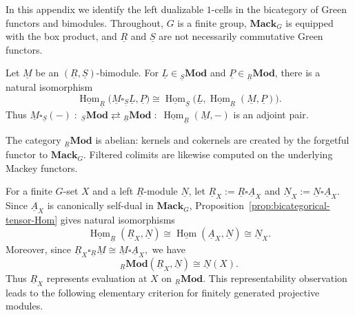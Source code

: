\documentclass[11pt,oneside]{amsart}
\DeclareMathOperator{\Hom}{Hom}
\numberwithin{equation}{section}
\numberwithin{figure}{section}
\theoremstyle{plain}
\theoremstyle{definition}
\theoremstyle{remark}
\begin{document}
In this appendix we identify the left dualizable \(1\)-cells in the
bicategory of Green functors and bimodules.  Throughout, \(G\) is a finite
group, \(\mathbf{Mack}_G\) is equipped with the box product, and
\(\underline R\) and \(\underline S\) are not necessarily commutative
Green functors.

\begin{prop}\label{prop:bicategorical-tensor-Hom}\cite{lewis1981theory}
Let \(\underline M\) be an
\((\underline R,\underline S)\)-bimodule.  For
\(\underline L\in{}_{\underline S}\mathbf{Mod}\) and
\(\underline P\in{}_{\underline R}\mathbf{Mod}\), there is a natural
isomorphism
\begin{equation}\label{eq:boxS-HomR-adjunction}
\underline{\Hom}_{\underline R}
 \bigl(\underline M\square_{\underline S}\underline L,\underline P\bigr)
\cong
\underline{\Hom}_{\underline S}
 \bigl(\underline L,
       \underline{\Hom}_{\underline R}(\underline M,\underline P)\bigr).
\end{equation}
Thus
\(
\underline M\square_{\underline S}(-)
\;:\;
{}_{\underline S}\mathbf{Mod}
\rightleftarrows
{}_{\underline R}\mathbf{Mod}
\;:\;
\underline{\Hom}_{\underline R}(\underline M,-)
\)
is an adjoint pair.
\end{prop}

The category \({}_{\underline R}\mathbf{Mod}\) is abelian: kernels and
cokernels are created by the forgetful functor to
\(\mathbf{Mack}_G\).  Filtered colimits are likewise computed on the
underlying Mackey functors.

For a finite $G$-set $X$ and a left $\underline R$-module $\underline N$, let $\underline R_X:=\underline R\square\underline A_X$ and $\underline N_X:=\underline N\square\underline A_X.$
Since \(\underline A_X\) is canonically self-dual in
\(\mathbf{Mack}_G\), Proposition~\ref{prop:bicategorical-tensor-Hom}
gives natural isomorphisms
\begin{equation}\label{eq:Hom-RX-N}
\underline{\Hom}_{\underline R}(\underline R_X,\underline N)
\cong
\underline{\Hom}(\underline A_X,\underline N)
\cong
\underline N_X.
\end{equation}
Moreover, since $\underline R_X\square_{\underline R}\underline M \cong \underline M \square \underline A_X,$ we have
\begin{equation}\label{eq:Mod-RX-N}
{}_{\underline R}\mathbf{Mod}(\underline R_X,\underline N)
\cong
\underline N(X).
\end{equation}
Thus \(\underline R_X\) represents evaluation at \(X\) on
\({}_{\underline R}\mathbf{Mod}\). 
This representability observation leads to the following elementary criterion for finitely generated projective modules.
\end{document}
